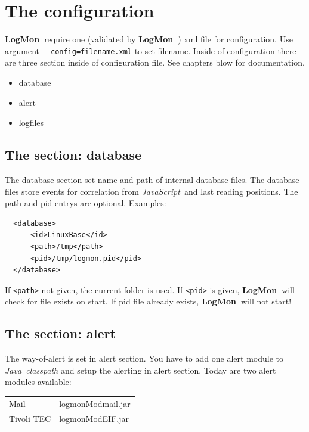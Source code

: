 \documentclass[11pt,a4paper]{article}
\newcommand{\logmon}{\textbf{LogMon\ }}
\newcommand{\js}{\textit{JavaScript\ }}
\newcommand{\java}{\textit{Java\ }}
\begin{document}
\section{The configuration}
\label{sec:conf}

\logmon require one (validated by \logmon) xml file for configuration. Use
argument \verb#--config=filename.xml# to set filename. Inside of
configuration there are three section inside of configuration file. See chapters
blow for documentation.

\begin{itemize}
  \item database
  \item alert
  \item logfiles
\end{itemize}

\subsection{The section: database}
\label{sec:cfgdb}

The database section set name and path of internal database files. The database files store events for
correlation from \js and last reading positions. The path and pid entrys are
optional. Examples:

\begin{verbatim}
  <database>
      <id>LinuxBase</id>
      <path>/tmp</path>
      <pid>/tmp/logmon.pid</pid>
  </database>
\end{verbatim}

If \verb#<path># not given, the current folder is used. If \verb#<pid># is
given, \logmon will check for file exists on start. If pid file already exists,
\logmon will not start!

\subsection{The section: alert}

The way-of-alert is set in alert section. You have to add one alert module to \java \textit{classpath}
and setup the alerting in alert section. Today are two alert modules available:

\bigskip
\begin{tabular}{ll}
  Mail 	     & logmonModmail.jar\\[1ex]
  Tivoli TEC & logmonModEIF.jar\\
\end{tabular}
\bigskip
\end{document}
